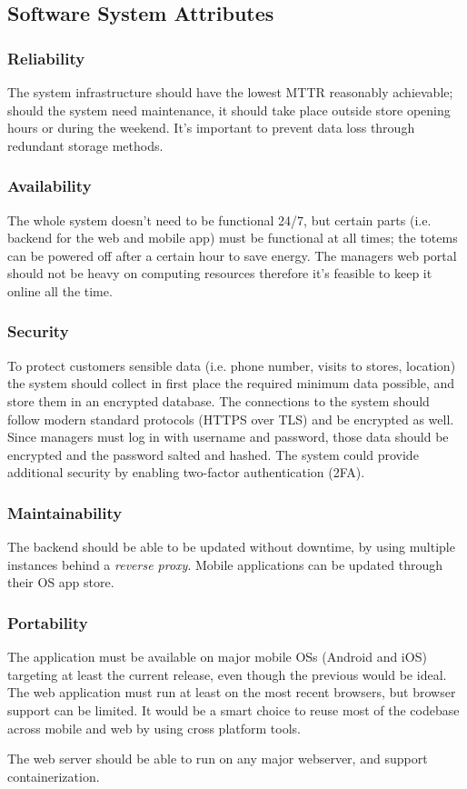 \subsection{Software System Attributes}
\subsubsection{Reliability}
The system infrastructure should have the lowest MTTR reasonably achievable; should the system need maintenance, it should take place outside store opening hours or during the weekend. It's important to prevent data loss through redundant storage methods.

\subsubsection{Availability}
The whole system doesn't need to be functional 24/7, but certain parts (i.e. backend for the web and mobile app) must be functional at all times; the totems can be powered off after a certain hour to save energy. The managers web portal should not be heavy on computing resources therefore it's feasible to keep it online all the time.
\subsubsection{Security}
To protect customers sensible data (i.e. phone number, visits to stores, location) the system should collect in first place the required minimum data possible, and store them in an encrypted database. The connections to the system should follow modern standard protocols (HTTPS over TLS) and be encrypted as well. Since managers must log in with username and password, those data should be encrypted and the password salted and hashed. The system could provide additional security by enabling two-factor authentication  (2FA).

\subsubsection{Maintainability}
The backend should be able to be updated without downtime, by using multiple instances behind a \emph{reverse proxy}.
Mobile applications can be updated through their OS app store.

\subsubsection{Portability}
The application must be available on major mobile OSs (Android and iOS) targeting at least the current release, even though the previous would be ideal.
The web application must run at least on the most recent browsers, but browser support can be limited.
It would be a smart choice to reuse most of the codebase across mobile and web by using cross platform tools.

The web server should be able to run on any major webserver, and support containerization.